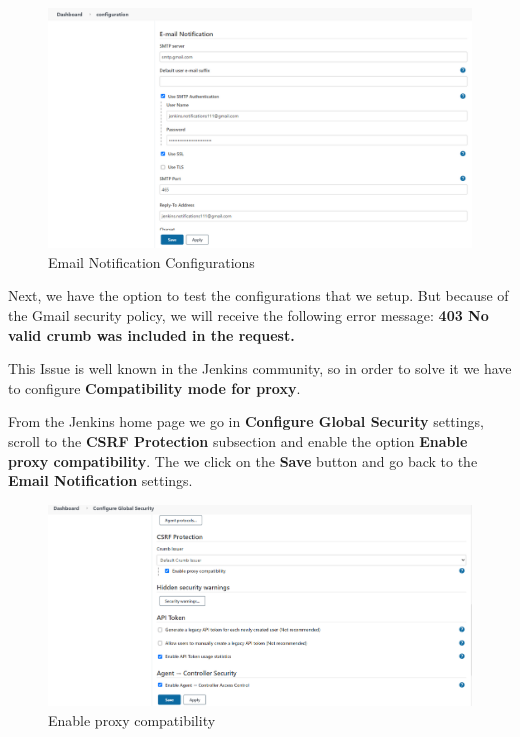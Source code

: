 \documentclass[12pt,a4paper,twoside]{article}
\begin{document}
\begin{figure}[H]
    \centering
        \includegraphics[width=15cm]{images-aws/51-email-settings.png}
        \caption{Email Notification Configurations}
\end{figure}


Next, we have the option to test the configurations that we setup. But because of the Gmail security policy, we will receive the following error message: \textbf{403 No valid crumb was included in the request.}


This Issue is well known in the Jenkins community, so in order to solve it we have to configure \textbf{Compatibility mode for proxy}. 


From the Jenkins home page we go in \textbf{Configure Global Security} settings, scroll to the \textbf{CSRF Protection} subsection and enable the option \textbf{Enable proxy compatibility}. The we click on the \textbf{Save} button and go back to the \textbf{Email Notification} settings.


\begin{figure}[H]
    \centering
        \includegraphics[width=15cm]{images-aws/52-enable-proxy-compatibility.png}
        \caption{Enable proxy compatibility}
\end{figure}
\end{document}
